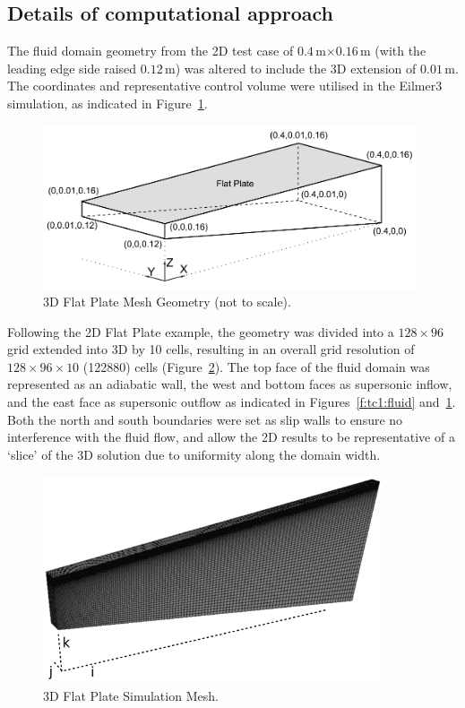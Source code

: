 \subsection{Details of computational approach}
The fluid domain geometry from the 2D test case of $0.4$\,m$\times0.16$\,m (with the leading edge side raised $0.12$\,m) was altered to include the 3D extension of $0.01$\,m. The coordinates and representative control volume were utilised in the Eilmer3 simulation, as indicated in Figure~\ref{f:tc1:geometry}.
%
\begin{figure}[htbp]
 \begin{center}
  \includegraphics[width=11cm]{./chap6-3Dflatplate/figs/3Dcoordinates.pdf}
  \caption{3D Flat Plate Mesh Geometry (not to scale).}
  \label{f:tc1:geometry}
 \end{center}
\end{figure}
%
Following the 2D Flat Plate example, the geometry was divided into a $128\times96$ grid extended into 3D by 10 cells, resulting in an overall grid resolution of $128\times96\times10$ (122880) cells (Figure~\ref{f:tc1:mesh}). 
The top face of the fluid domain was represented as an adiabatic wall, the west and bottom faces as supersonic inflow, and the east face as supersonic outflow as indicated in Figures~\ref{f:tc1:fluid} and~\ref{f:tc1:geometry}. Both the north and south boundaries were set as slip walls to ensure no interference with the fluid flow, and allow the 2D results to be representative of a `slice' of the 3D solution due to uniformity along the domain width.
%
\begin{figure}[htbp]
 \begin{center}
  \includegraphics[width=10cm]{./chap6-3Dflatplate/figs/tc1meshbw2.png}
  \caption{3D Flat Plate Simulation Mesh.}
  \label{f:tc1:mesh}
 \end{center}
\end{figure}
